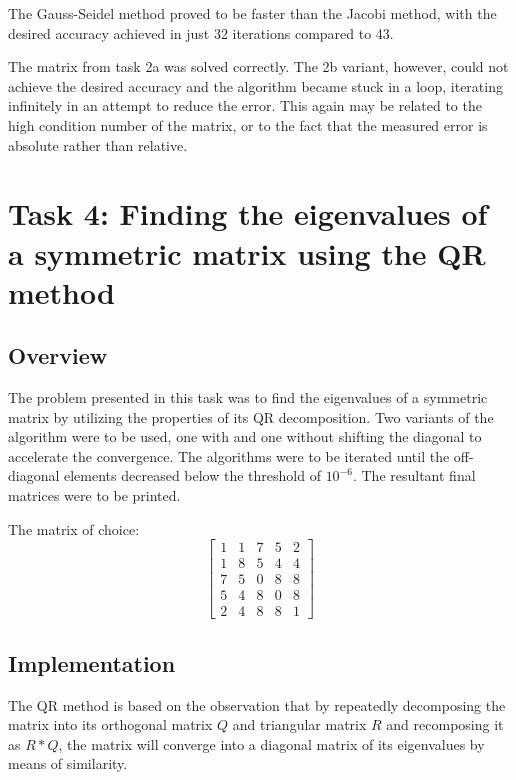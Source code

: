 \documentclass{article}
\begin{document}
	The Gauss-Seidel method proved to be faster than the Jacobi method, with the
	desired accuracy achieved in just 32 iterations compared to 43.
	
	The matrix from task 2a was solved correctly. The 2b variant, however, could
	not achieve the desired accuracy and the algorithm became stuck in a
	loop, iterating infinitely in an attempt to reduce the error. This again
	may be related to the high condition number of the matrix, or to the fact
	that the measured error is absolute rather than relative.
	
	\section{Task 4: Finding the eigenvalues of a symmetric matrix using the QR
	method}
	
	\subsection{Overview}
	
	The problem presented in this task was to find the eigenvalues of a
	symmetric matrix by utilizing the properties of its QR decomposition. Two
	variants of the algorithm were to be used, one with and one without shifting
	the diagonal to accelerate the convergence. The algorithms were to be
	iterated until the off-diagonal elements decreased below the threshold of
	$10^{-6}$. The resultant final matrices were to be printed.
	
	The matrix of choice:
	\begin{equation*}
		\begin{bmatrix}
			1 & 1 & 7 & 5 & 2\\
			1 & 8 & 5 & 4 & 4\\
			7 & 5 & 0 & 8 & 8\\
			5 & 4 & 8 & 0 & 8\\
			2 & 4 & 8 & 8 & 1
		\end{bmatrix}
	\end{equation*}
	
	\subsection{Implementation}
	
	The QR method is based on the observation that by repeatedly decomposing the
	matrix into its orthogonal matrix $Q$ and triangular matrix $R$ and
	recomposing it as $R * Q$, the matrix will converge into a diagonal matrix
	of its eigenvalues by means of similarity.
	
\end{document}
